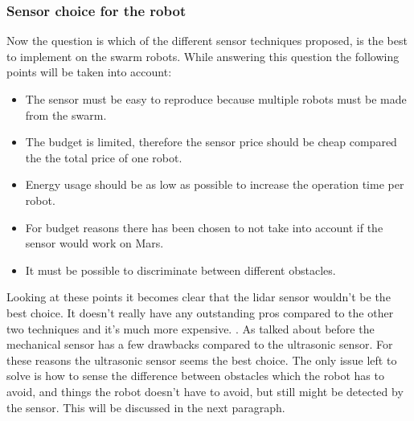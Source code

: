 \documentclass[10pt,a4paper]{article}
\begin{document}
\subsubsection{Sensor choice for the robot}
Now the question is which of the different sensor techniques proposed, is the best to implement on the swarm robots. While answering this question the following points will be taken into account:

\begin{itemize}
\setlength\itemsep{0em}
    \item The sensor must be easy to reproduce because multiple robots must be made from the swarm.
    \item The budget is limited, therefore the sensor price should be cheap compared the the total price of one robot.
    \item Energy usage should be as low as possible to increase the operation time per robot.
    \item For budget reasons there has been chosen to not take into account if the sensor would work on Mars.
    \item It must be possible to discriminate between different obstacles.
\end{itemize}

Looking at these points it becomes clear that the lidar sensor wouldn't be the best choice. It doesn't really have any outstanding pros compared to the other two techniques and it's much more expensive. . As talked about before the mechanical sensor has a few drawbacks compared to the ultrasonic sensor. For these reasons the ultrasonic sensor seems the best choice. The only issue left to solve is how to sense the difference between obstacles which the robot has to avoid, and things the robot doesn't have to avoid, but still might be detected by the sensor. This will be discussed in the next paragraph.
\end{document}
